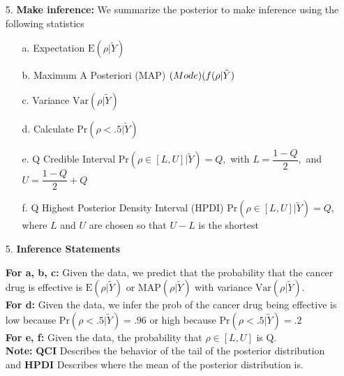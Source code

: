 \documentclass[12pt,xcolor=svgnames]{beamer}
\newcommand{\rd}{\color{red}}
\newcommand{\bl}{\color{blue}}
\newcommand{\pr}{\text{Pr}}
\begin{document}
\begin{frame}
\begin{enumerate}

\item[5.] {\bf Make inference:} We summarize the posterior to make inference using the following statistics
\begin{enumerate}
\item[a.] Expectation $\text{E}(\rho|\tilde{Y})$%
\item[b.] Maximum A Posteriori (MAP) $\text(Mode) (f(\rho|\tilde{Y})$%
\item[c.] Variance $\text{Var}(\rho|\tilde{Y} )$%
\item[d.] Calculate $\pr(\rho<.5|\tilde{Y}) $%
\item[e.] Q Credible Interval $\pr(\rho \in [L, U] |\tilde{Y}) = Q,$ with $L = \dfrac{1-Q}{2},$ and $U = \dfrac{1-Q}{2} +Q$
\item[f.] Q Highest Posterior Density Interval (HPDI) $\pr(\rho \in [L, U] |\tilde{Y}) = Q,$ where $L$ and $U$ are chosen so that $U-L$ is the shortest
\end{enumerate}
 \end{enumerate}
\end{frame}


\begin{frame}
\begin{enumerate}

\item[5.] {\bf Inference Statements} 

{\bf For a, b, c:} Given the data, we predict that the probability that the cancer drug is effective is $\text{E}(\rho|\tilde{Y})$ or  $\text{MAP}(\rho|\tilde{Y})$ with variance $\text{Var}(\rho|\tilde{Y})$. \\

{\bf For d:} Given the data, we infer the prob of the cancer drug being effective is low because $\pr(\rho<.5|\tilde{Y}) = .96$ or high because $\pr(\rho<.5|\tilde{Y}) = .2$\\

{\bf For e, f:} Given the data, the probability that $\rho \in [L, U]$ is Q. \\

{\rd \bf Note:} {\bf QCI} Describes the behavior of the {\bl  tail} of the posterior distribution and { \bf HPDI} Describes where the {\bl mean} of the posterior distribution is.\\


\end{enumerate}
\end{frame}
\end{document}
